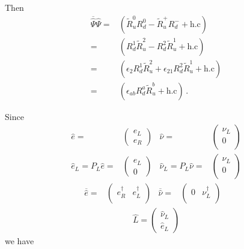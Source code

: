 Then
\begin{align}
\overline{\widehat{\Psi}}\widehat{\Psi} 
=& \left(\widetilde{R}_u^0 R_{d}^0-\widetilde{R}_u^{+}R_d^- +\text{h.c}  \right)  \nonumber\\
=& \left(R_d^1 \widetilde{R}_u^2-R_d^2 \widetilde{R}_u^1 +\text{h.c} \right) \nonumber\\
=& \left(\epsilon_2R_d^1 \widetilde{R}_u^2+ \epsilon_{21}R_d^2 \widetilde{R}_u^1 +\text{h.c} \right) \nonumber\\
=& \left(\epsilon_{ab}R_d^a \widetilde{R}_u^b +\text{h.c} \right)\,.
\end{align}

Since
\begin{align*}
  \widehat{e}=&
  \begin{pmatrix}
    e_L\\
    e_R
  \end{pmatrix}&
\widehat{\nu}=&
\begin{pmatrix}
\nu_L\\
0\\  
\end{pmatrix}\nonumber\\
\widehat{e}_L= P_L\widehat{e}=&
  \begin{pmatrix}
    e_L\\
    0
  \end{pmatrix}&
\widehat{\nu}_L=P_L\widehat{\nu}=&
\begin{pmatrix}
\nu_L\\
0\\  
\end{pmatrix}
\end{align*}
\begin{align*}
    \overline{\widehat{e}}=&
  \begin{pmatrix}
  e_R^{\dagger} &   e_L^{\dagger} \\
  \end{pmatrix}&
    \overline{\widehat{\nu}}=&
  \begin{pmatrix}
  0 &   \nu_L^{\dagger} \\
  \end{pmatrix}&
\end{align*}
\begin{align*}
  \widehat{L}=
  \begin{pmatrix}
  \widehat{\nu}_L\\
  \widehat{e}_L    
  \end{pmatrix}
\end{align*}
we have
